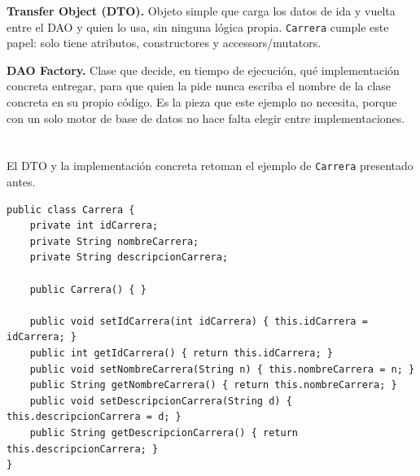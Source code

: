 \documentclass[10pt,a4paper]{article}
\begin{document}
\textbf{Transfer Object (DTO).} Objeto simple que carga los datos de ida y vuelta entre el DAO y quien lo usa, sin ninguna lógica propia. \texttt{Carrera} cumple este papel: solo tiene atributos, constructores y accessors/mutators.

\textbf{DAO Factory.} Clase que decide, en tiempo de ejecución, qué implementación concreta entregar, para que quien la pide nunca escriba el nombre de la clase concreta en su propio código. Es la pieza que este ejemplo no necesita, porque con un solo motor de base de datos no hace falta elegir entre implementaciones.

\section{\color{colorIPN}{Ejemplo en Java}}

El DTO y la implementación concreta retoman el ejemplo de \texttt{Carrera} presentado antes.

\begin{lstlisting}[caption={Transfer Object: Carrera.java (fragmento)}]
public class Carrera {
    private int idCarrera;
    private String nombreCarrera;
    private String descripcionCarrera;

    public Carrera() { }

    public void setIdCarrera(int idCarrera) { this.idCarrera = idCarrera; }
    public int getIdCarrera() { return this.idCarrera; }
    public void setNombreCarrera(String n) { this.nombreCarrera = n; }
    public String getNombreCarrera() { return this.nombreCarrera; }
    public void setDescripcionCarrera(String d) { this.descripcionCarrera = d; }
    public String getDescripcionCarrera() { return this.descripcionCarrera; }
}
\end{lstlisting}
\end{document}
